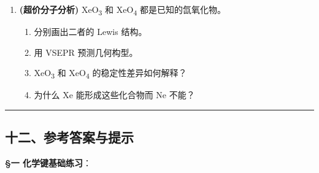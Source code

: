 \begin{enumerate}
  \begin{itemize}
  \tightlist
  \item
    含一个第二周期中心原子 A 和两个相同配体 B
  \item
    A 的氧化态为 +4
  \item
    分子具有顺磁性
  \item
    总价电子数为 18
  \end{itemize}

  \begin{enumerate}
  \def\labelenumii{(\alph{enumii})}
  \tightlist
  \item
    推断 X 的可能化学式。
  \item
    画出 Lewis 结构和 MO 能级图。
  \item
    解释其顺磁性的来源。
  \end{enumerate}
\item
  \textbf{(超价分子分析)} XeO\textsubscript{3} 和 XeO\textsubscript{4} 都是已知的氙氧化物。

  \begin{enumerate}
  \def\labelenumii{(\alph{enumii})}
  \tightlist
  \item
    分别画出二者的 Lewis 结构。
  \item
    用 VSEPR 预测几何构型。
  \item
    XeO\textsubscript{3} 和 XeO\textsubscript{4} 的稳定性差异如何解释？
  \item
    为什么 Xe 能形成这些化合物而 Ne 不能？
  \end{enumerate}
\end{enumerate}

\begin{center}\rule{0.5\linewidth}{0.5pt}\end{center}

\subsection{十二、参考答案与提示}\label{ux5341ux4e8cux53c2ux8003ux7b54ux6848ux4e0eux63d0ux793a}

\textbf{§一 化学键基础练习}：

